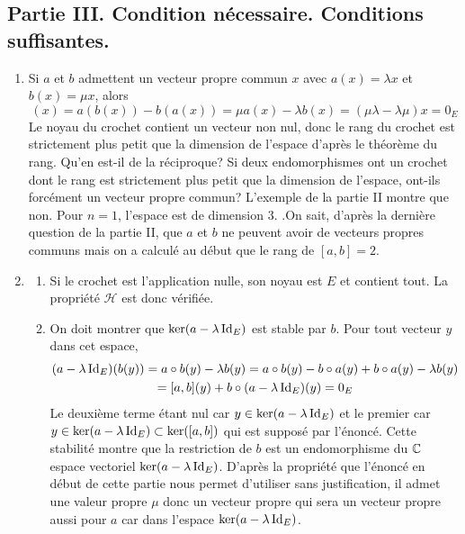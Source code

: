 \subsection*{Partie III. Condition nécessaire. Conditions suffisantes.}
\begin{enumerate}
\item Si $a$ et $b$ admettent un vecteur propre commun $x$ avec $a(x)=\lambda x$ et $b(x)=\mu x$, alors
\begin{displaymath}
 [a,b](x) = a(b(x)) - b(a(x))= \mu a(x) - \lambda b(x) = (\mu \lambda -\lambda \mu)x= 0_E
\end{displaymath}
Le noyau du crochet contient un vecteur non  nul, donc le rang du crochet est strictement plus petit que la dimension de l'espace d'après le théorème du rang.\newline
Qu'en est-il de la réciproque? Si deux endomorphismes ont un crochet dont le rang est strictement plus petit que la dimension de l'espace, ont-ils forcément un vecteur propre  commun?\newline
L'exemple de la partie II montre que non. Pour $n=1$, l'espace est de dimension 3. .On sait, d'après la dernière question de la partie II, que $a$ et $b$ ne peuvent avoir de vecteurs propres communs mais on a calculé au début que le rang de $[a,b]=2$.

\item \label{cronul}
\begin{enumerate}
 \item Si le crochet est l'application nulle, son noyau est $E$ et contient tout. La propriété $\mathcal{H}$ est donc vérifiée.
 \item On doit montrer que $\ker(a-\lambda \operatorname{Id}_E)$ est stable par $b$. Pour tout vecteur $y$ dans cet espace, 
\begin{multline*}
 (a-\lambda \operatorname{Id}_E)(b(y))=a\circ b(y)-\lambda b(y)
= a\circ b(y) - b\circ a(y) +b\circ a (y) -\lambda b(y) \\
= [a,b](y) +b\circ (a -\lambda \operatorname{Id}_E)(y) = 0_E
\end{multline*}
Le deuxième terme étant nul car $y\in \ker(a-\lambda \operatorname{Id}_E)$ et le premier car $y\in \ker(a-\lambda \operatorname{Id}_E)\subset \ker([a,b])$ qui est supposé par l'énoncé.\newline
Cette stabilité montre que la restriction de $b$ est un endomorphisme du $\mathbb{C}$ espace vectoriel $\ker(a-\lambda \operatorname{Id}_E)$. D'après la propriété que l'énoncé en début de cette partie nous permet d'utiliser sans justification, il admet une valeur propre $\mu$ donc un vecteur propre qui sera un vecteur propre aussi pour $a$ car dans l'espace $\ker(a-\lambda \operatorname{Id}_E)$.
\end{enumerate}


\end{enumerate}
